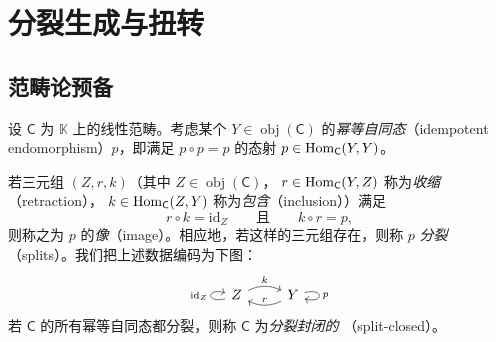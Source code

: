 \section{分裂生成与扭转}\label{ch:04}


\subsection{范畴论预备}\label{sec:4.1}

\begin{Def}\label{def:4.1}
设 $\mathsf C$ 为 $\mathbb K$ 上的线性范畴。考虑某个 $Y\in\operatorname{obj}(\mathsf C)$
的\emph{幂等自同态}（idempotent endomorphism）$p$，即满足 $p\circ p=p$ 的态射
$p\in\operatorname{Hom}_{\mathsf C}(Y,Y)$。

若三元组 $(Z,r,k)$（其中 $Z\in\operatorname{obj}(\mathsf C)$，
$r\in\operatorname{Hom}_{\mathsf C}(Y,Z)$ 称为\emph{收缩}（retraction），
$k\in\operatorname{Hom}_{\mathsf C}(Z,Y)$ 称为\emph{包含}（inclusion））满足
\[
  r\circ k=\mathrm{id}_Z
  \qquad\text{且}\qquad
  k\circ r=p,
\]
则称之为 $p$ 的\emph{像}（image）。相应地，若这样的三元组存在，则称 $p$
\emph{分裂}（splits）。我们把上述数据编码为下图：
\begin{equation}\label{eq:4.52}
  \begin{tikzcd}
    Z \arrow[loop left, "{\mathrm{id}_Z}"] \arrow[r, bend left=25, "k"]
      & Y \arrow[l, bend left=25, "r"'] \arrow[loop right, "p"]
  \end{tikzcd}
\end{equation}
若 $\mathsf C$ 的所有幂等自同态都分裂，则称 $\mathsf C$ 为\emph{分裂封闭的}
（split-closed）。
\end{Def}

